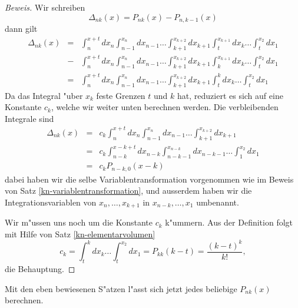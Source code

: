 \begin{proof}[Beweis]
Wir schreiben
$$\Delta_{nk}(x)= P_{nk}(x)-P_{n,k-1}(x)
$$
dann gilt
\begin{eqnarray*}
\Delta_{nk}(x)
&=&
\int_n^{x+t}dx_n\int_{n-1}^{x_n}dx_{n-1}\dots\int_{k+1}^{x_{k+2}}dx_{k+1}
\int_t^{x_{k+1}}dx_k\dots\int_t^{x_2}dx_1\\
&-&\int_n^{x+t}dx_n\int_{n-1}^{x_n}dx_{n-1}\dots\int_{k+1}^{x_{k+2}}dx_{k+1}
\int_{k}^{x_{k+1}}dx_k\dots\int_t^{x_2}dx_1\\
&=&
\int_n^{x+t}dx_n\int_{n-1}^{x_n}dx_{n-1}\dots\int_{k+1}^{x_{k+2}}dx_{k+1}
\int_{t}^{k}dx_k\dots\int_t^{x_2}dx_1
\end{eqnarray*}
Da das Integral "uber $x_k$ feste Grenzen $t$ und $k$ hat, reduziert es
sich auf eine Konstante $c_k$, welche wir weiter unten berechnen werden.
Die verbleibenden Integrale sind
\begin{eqnarray*}
\Delta_{nk}(x)
&=&
c_k\int_n^{x+t}dx_n\int_{n-1}^{x_n}dx_{n-1}\dots\int_{k+1}^{x_{k+2}}dx_{k+1}\\
&=&
c_k\int_{n-k}^{x-k+t}dx_{n-k}\int_{n-k-1}^{x_{n-k}}dx_{n-k-1}\dots\int_1^{x_2}dx_1\\
&=&c_kP_{n-k,0}(x-k)
\end{eqnarray*}
dabei haben wir die selbe Variablentransformation vorgenommen wie im
Beweis von Satz \ref{kn-variablentransformation}, und ausserdem haben
wir die Integrationsvariablen von $x_n,\dots,x_{k+1}$ in $x_{n-k},\dots,x_1$
umbenannt.

Wir m"ussen uns noch um die Konstante $c_k$ k"ummern.
Aus der Definition folgt mit Hilfe von Satz \ref{kn-elementarvolumen}
\begin{equation}
c_k = \int_{t}^{k}dx_k\dots\int_t^{x_2}dx_1=P_{kk}(k-t)=\frac{(k-t)^k}{k!},
\end{equation}
die Behauptung.
\end{proof}
Mit den eben bewiesenen S"atzen l"asst sich jetzt jedes beliebige 
$P_{nk}(x)$ berechnen.

